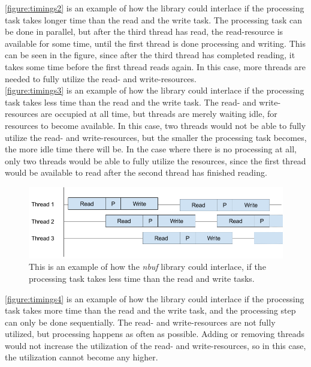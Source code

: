 \documentclass[a4paper]{article}
\newcommand{\nbuf}{\textit{nbuf} }
\begin{document}
\autoref{figure:timings2} is an example of how the library could interlace if the processing task takes longer time than the read and the write task. The processing task can be done in parallel, but after the third thread has read, the read-resource is available for some time, until the first thread is done processing and writing. This can be seen in the figure, since after the third thread has completed reading, it takes some time before the first thread reads again. In this case, more threads are needed to fully utilize the read- and write-resources.\\


\autoref{figure:timings3} is an example of how the library could interlace if the processing task takes less time than the read and the write task. The read- and write-resources are occupied at all time, but threads are merely waiting idle, for resources to become available. In this case, two threads would not be able to fully utilize the read- and write-resources, but the smaller the processing task becomes, the more idle time there will be. In the case where there is no processing at all, only two threads would be able to fully utilize the resources, since the first thread would be available to read after the second thread has finished reading.\\

\begin{figure}
	\begin{adjustwidth}{-0.5in}{-0.5in}
    \centering
     \includegraphics[scale=0.5]{figures/timings3.png}
  	\caption{This is an example of how the \nbuf library could interlace, if the processing task takes less time than the read and write tasks.}
	\label{figure:timings3}
	\end{adjustwidth}
\end{figure}

\autoref{figure:timings4} is an example of how the library could interlace if the processing task takes more time than the read and the write task, and the processing step can only be done sequentially. The read- and write-resources are not fully utilized, but processing happens as often as possible. Adding or removing threads would not increase the utilization of the read- and write-resources, so in this case, the utilization cannot become any higher.\\
\end{document}

